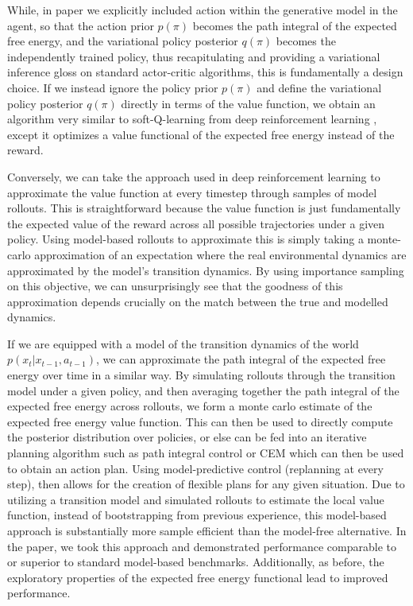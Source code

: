 While, in \citet{millidge_deep_2019} paper we explicitly included action within the generative model in the agent, so that the action prior $p(\pi)$ becomes the path integral of the expected free energy, and the variational policy posterior $q(\pi)$ becomes the independently trained policy, thus recapitulating and providing a variational inference gloss on standard actor-critic algorithms, this is fundamentally a design choice. If we instead ignore the policy prior $p(\pi)$ and define the variational policy posterior $q(\pi)$ directly in terms of the value function, we obtain an algorithm very similar to soft-Q-learning from deep reinforcement learning \citep{haarnoja2018soft}, except it optimizes a value functional of the expected free energy instead of the reward.

Conversely, we can take the approach used in deep reinforcement learning to approximate the value function at every timestep through samples of model rollouts. This is straightforward because the value function is just fundamentally the expected value of the reward across all possible trajectories under a given policy. Using model-based rollouts to approximate this is simply taking a monte-carlo approximation of an expectation where the real environmental dynamics are approximated by the model's transition dynamics. By using importance sampling on this objective, we can unsurprisingly see that the goodness of this approximation depends crucially on the match between the true and modelled dynamics.

If we are equipped with a model of the transition dynamics of the world $p(x_t | x_{t-1}, a_{t-1})$, we can approximate the path integral of the expected free energy over time in a similar way. By simulating rollouts through the transition model under a given policy, and then averaging together the path integral of the expected free energy across rollouts, we form a monte carlo estimate of the expected free energy value function. This can then be used to directly compute the posterior distribution over policies, or else can be fed into an iterative planning algorithm such as path integral control or CEM which can then be used to obtain an action plan. Using model-predictive control (replanning at every step), then allows for the creation of flexible plans for any given situation. Due to utilizing a transition model and simulated rollouts to estimate the local value function, instead of bootstrapping from previous experience, this model-based approach is substantially more sample efficient than the model-free alternative. In the \citet{tschantz2020reinforcement} paper, we took this approach and demonstrated performance comparable to or superior to standard model-based benchmarks. Additionally, as before, the exploratory properties of the expected free energy functional lead to improved performance.


